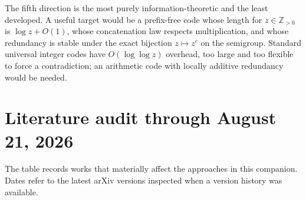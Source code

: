 \documentclass[11pt,oneside]{article}
\theoremstyle{definition}
\theoremstyle{remark}
\newcommand{\Z}{\mathbb{Z}}
\begin{document}
The fifth direction is the most purely information-theoretic and the least developed.  A useful target would be a prefix-free code whose length for \(z\in\Z_{>0}\) is \(\log z+O(1)\), whose concatenation law respects multiplication, and whose redundancy is stable under the exact bijection \(z\mapsto z^c\) on the semigroup.  Standard universal integer codes have \(O(\log\log z)\) overhead, too large and too flexible to force a contradiction; an arithmetic code with locally additive redundancy would be needed.

\section{Literature audit through August 21, 2026}\label{sec:literature}

The table records works that materially affect the approaches in this companion.  Dates refer to the latest arXiv versions inspected when a version history was available.
\end{document}
